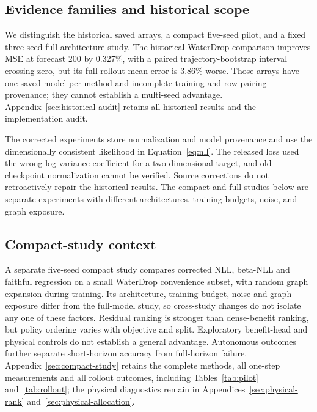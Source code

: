 \subsection{Evidence families and historical scope}
We distinguish the historical saved arrays, a compact five-seed pilot, and a fixed three-seed full-architecture study. The historical WaterDrop comparison improves MSE at forecast 200 by 0.327\%, with a paired trajectory-bootstrap interval crossing zero, but its full-rollout mean error is 3.86\% worse. Those arrays have one saved model per method and incomplete training and row-pairing provenance; they cannot establish a multi-seed advantage. Appendix~\ref{sec:historical-audit} retains all historical results and the implementation audit.

The corrected experiments store normalization and model provenance and use the dimensionally consistent likelihood in Equation~\ref{eq:nll}. The released loss used the wrong log-variance coefficient for a two-dimensional target, and old checkpoint normalization cannot be verified. Source corrections do not retroactively repair the historical results. The compact and full studies below are separate experiments with different architectures, training budgets, noise, and graph exposure.





\subsection{Compact-study context}
A separate five-seed compact study compares corrected NLL, beta-NLL and
faithful regression on a small WaterDrop convenience subset, with random
graph expansion during training. Its architecture, training budget, noise
and graph exposure differ from the full-model study, so cross-study changes
do not isolate any one of these factors. Residual ranking is stronger than
dense-benefit ranking, but policy ordering varies with objective and split.
Exploratory benefit-head and physical controls do not establish a general
advantage. Autonomous outcomes further separate short-horizon accuracy from
full-horizon failure. Appendix~\ref{sec:compact-study} retains the complete
methods, all one-step measurements and all rollout outcomes, including
Tables~\ref{tab:pilot} and~\ref{tab:rollout}; the physical diagnostics remain
in Appendices~\ref{sec:physical-rank} and~\ref{sec:physical-allocation}.

